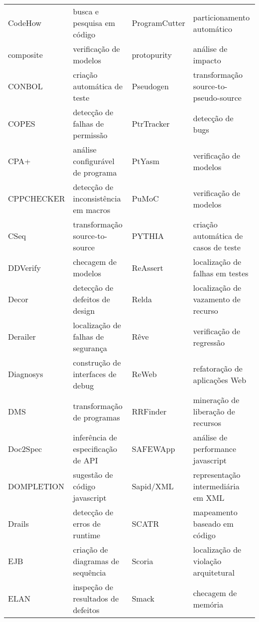 \begin{table}[h]
{\begin{tabular}{| l | l | l | l |}
  CodeHow        & busca e pesquisa em código           & ProgramCutter    & particionamento automático           \\
  composite      & verificação de modelos               & protopurity      & análise de impacto                   \\
  CONBOL         & criação automática de teste          & Pseudogen        & transformação source-to-pseudo-source \\
  COPES          & detecção de falhas de permissão      & PtrTracker       & detecção de bugs                     \\
  CPA+           & análise configurável de programa     & PtYasm           & verificação de modelos               \\
  CPPCHECKER     & detecção de inconsistência em macros & PuMoC            & verificação de modelos               \\
  CSeq           & transformação source-to-source       & PYTHIA           & criação automática de casos de teste \\
  DDVerify       & checagem de modelos                  & ReAssert         & localização de falhas em testes      \\
  Decor          & detecção de defeitos de design       & Relda            & localização de vazamento de recurso  \\
  Derailer       & localização de falhas de segurança   & Rêve             & verificação de regressão             \\
  Diagnosys      & construção de interfaces de debug    & ReWeb            & refatoração de aplicações Web        \\
  DMS            & transformação de programas           & RRFinder         & mineração de liberação de recursos   \\
  Doc2Spec       & inferência de especificação de API   & SAFEWApp         & análise de performance javascript    \\
  DOMPLETION     & sugestão de código javascript        & Sapid/XML        & representação intermediária em XML   \\
  Drails         & detecção de erros de runtime         & SCATR            & mapeamento baseado em código         \\
  EJB            & criação de diagramas de sequência    & Scoria           & localização de violação arquitetural \\
  ELAN           & inspeção de resultados de defeitos   & Smack            & checagem de memória                  \\

\end{tabular}}
\end{table}
